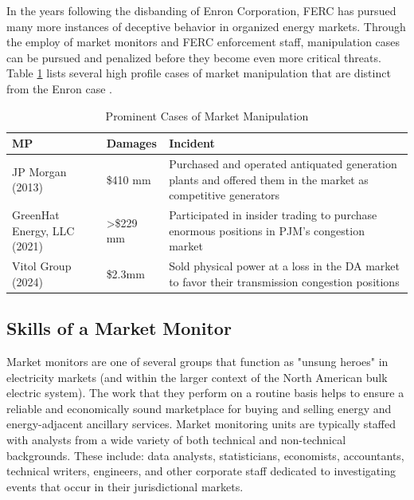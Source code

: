In the years following the disbanding of Enron Corporation, FERC has pursued many more instances of deceptive behavior in organized energy markets. Through the employ of market monitors and FERC enforcement staff, manipulation cases can be pursued and penalized before they become even more critical threats. Table \ref{tab:market-manipulation} lists several high profile cases of market manipulation that are distinct from the Enron case \cite{jpmorgan} \cite{greenhat} \cite{vitol}.

\begin{table}[ht]
    \centering
    \begin{tabular}{|p{2.5cm}|p{2cm}|p{9cm}|}
        \hline
        \textbf{MP} & \textbf{Damages} & \textbf{Incident} \\
        \hline
		JP Morgan  \newline (2013) & \$410 mm & Purchased and operated antiquated generation plants and offered them in the market as competitive generators \\
		\hline
		GreenHat \newline Energy, LLC \newline (2021) & >\$229 mm & Participated in insider trading to purchase enormous positions in PJM's congestion market \\
		\hline
        Vitol Group \newline (2024) & \$2.3mm & Sold physical power at a loss in the DA market to favor their transmission congestion positions \\
		\hline
    \end{tabular}
    \caption{Prominent Cases of Market Manipulation}
    \label{tab:market-manipulation}
\end{table}


\subsection{Skills of a Market Monitor}

Market monitors are one of several groups that function as "unsung heroes" in electricity markets (and within the larger context of the North American bulk electric system). The work that they perform on a routine basis helps to ensure a reliable and economically sound marketplace for buying and selling energy and energy-adjacent ancillary services. 
Market monitoring units are typically staffed with analysts from a wide variety of both technical and non-technical backgrounds. These include: data analysts, statisticians, economists, accountants, technical writers, engineers, and other corporate staff dedicated to investigating events that occur in their jurisdictional markets.

